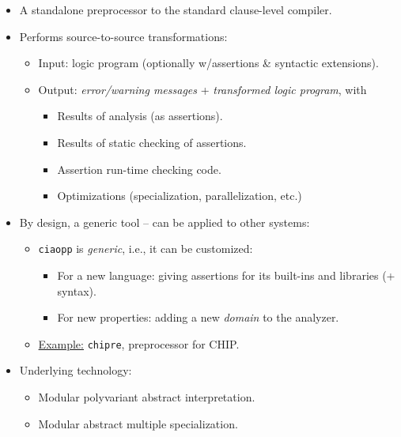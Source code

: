 \documentclass{article}
\renewcommand{\_}{\char'137}
\begin{document}
\begin{itemize}
\item A standalone preprocessor to the standard clause-level compiler.
\item Performs source-to-source transformations:
  \begin{itemize}
  \item Input: logic program (optionally w/assertions \& syntactic extensions).
  \item Output: \emph{error/warning messages} + \emph{transformed
      logic program}, with
    \begin{itemize}
    \item Results of analysis (as assertions).
    \item Results of static checking of assertions.
    \item Assertion run-time checking code.
    \item Optimizations (specialization, parallelization, etc.)
    \end{itemize}
  \end{itemize}

\item By design, a generic tool -- can be applied to other systems:

\begin{center}
\end{center}

\begin{itemize}
\item \texttt{ciaopp} is {\em generic}, i.e., it can be customized:
  \begin{itemize}
  \item For a new language: giving assertions for its
    built-ins and libraries (+ syntax).
  \item For new properties: adding a new {\em domain} to the analyzer.
  \end{itemize}
\item \underline{Example:} \texttt{chipre}, preprocessor for CHIP.
\end{itemize}

\item Underlying technology:
  \begin{itemize}
  \item Modular polyvariant abstract interpretation.
  \item Modular abstract multiple specialization.
  \end{itemize}


\end{itemize}
\end{document}
